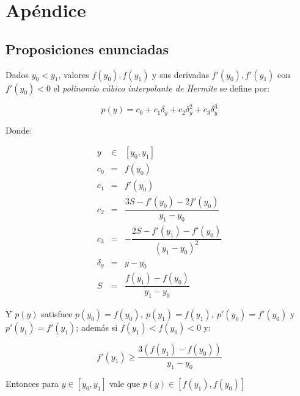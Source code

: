 \chapter{Ap\'endice}\label{ch: apendice}



\section{Proposiciones enunciadas}

\begin{theorem}
	\label{theorem: splines 1}
	Dados $y_0 < y_1$, valores $f(y_0), f(y_1)$ y sus derivadas $f'(y_0), f'(y_1)$ con $f'(y_0)<0$ el \textit{polinomio c\'ubico interpolante de Hermite} se define por:
	
	\begin{equation}
	p(y) = c_0 + c_1 \delta_y + c_2 \delta_y^2 + c_3 \delta_y^3
	\end{equation}
	
	Donde:
	
	\begin{equation*}
		\begin{array}{rcl}
		y & \in & [y_0, y_1] \\
		c_0 & = & f(y_0) \\
		c_1 & = & f'(y_0) \\
		c_2 & = & \dfrac{3S - f'(y_0) - 2f'(y_0)}{y_1 - y_0} \\
		c_3 & = & - \dfrac{2S - f'(y_1) - f'(y_0)}{\left(y_1 - y_0\right)^2} \\
		\delta_y & = & y - y_0 \\
		S & = & \dfrac{f(y_1) - f(y_0)}{y_1 - y_0}
		\end{array}
	\end{equation*}
	
	Y $p(y)$ satisface $p(y_0) = f(y_0), \ p(y_1) = f(y_1), \ p'(y_0) = f'(y_0)$ y $p'(y_1)=f'(y_1)$; adem\'as si $f(y_1) < f(y_0) < 0$ y:
	
	\begin{equation*}
		f'(y_1) \geq \dfrac{3 \left(f(y_1) - f(y_0)\right)}{y_1 - y_0}
	\end{equation*}
	
	Entonces para $y \in [y_0, y_1]$ vale que $p(y) \in \left[f(y_1), f(y_0)\right]$
	
\end{theorem}

